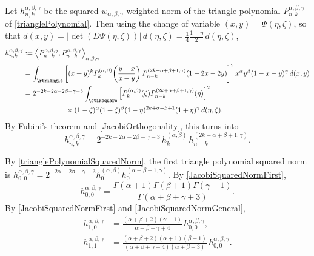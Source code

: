 \documentclass{article}
\numberwithin{equation}{section}
\numberwithin{figure}{section}
\begin{document}
Let $h^{\alpha,\beta,\gamma}_{n,k}$ be the squared $w_{\alpha,\beta,\gamma}$-weighted norm of the triangle polynomial $P^{\alpha,\beta,\gamma}_{n,k}$ of \eqref{trianglePolynomial}.
Then using the change of variable $(x,y) = \Psi(\eta,\zeta)$, so that $d(x,y) = \lvert \det(D\Psi(\eta,\zeta)) \rvert \, d(\eta,\zeta) = \frac{1}{4} \frac{1-\eta}{2} \, d(\eta,\zeta)$,
%
\begin{equation*}
\begin{split}
h^{\alpha,\beta,\gamma}_{n,k} & := \left\langle P^{\alpha,\beta,\gamma}_{n-k}, P^{\alpha,\beta,\gamma}_{n-k} \right\rangle_{\alpha,\beta,\gamma}\\
& = \int_\rtriangle \left[ (x+y)^k P^{(\alpha,\beta)}_k\mathopen{}\left( \frac{y-x}{x+y} \mathclose{}\right) P^{(2k+\alpha+\beta+1,\gamma)}_{n-k}(1-2x-2y) \right]^2 x^\alpha y^\beta (1-x-y)^\gamma \, d(x,y)\\
& = 2^{-2k-2\alpha-2\beta-\gamma-3} \int_\stixsquare \left[ P^{(\alpha,\beta)}_k(\zeta) P^{(2k+\alpha+\beta+1,\gamma)}_{n-k}(\eta) \right]^2\\& \qquad\qquad\qquad \times (1-\zeta)^\alpha (1+\zeta)^\beta (1-\eta)^{2k+\alpha+\beta+1} (1+\eta)^\gamma \, d(\eta,\zeta).
\end{split}
\end{equation*}
%
By Fubini's theorem and \eqref{JacobiOrthogonality}, this turns into
%
\begin{equation}\label{trianglePolynomialSquaredNorm}
h^{\alpha,\beta,\gamma}_{n,k} = 2^{-2k-2\alpha-2\beta-\gamma-3} \, h^{(\alpha,\beta)}_k \, h^{(2k+\alpha+\beta+1,\gamma)}_{n-k}.
\end{equation}
%

By \eqref{trianglePolynomialSquaredNorm}, the first triangle polynomial squared norm is $h^{\alpha,\beta,\gamma}_{0,0} = 2^{-2\alpha-2\beta-\gamma-3} h^{(\alpha,\beta)}_0 h^{(\alpha+\beta+1,\gamma)}_0$.
By \eqref{JacobiSquaredNormFirst},
%
\begin{equation}\label{h00}
h^{\alpha,\beta,\gamma}_{0,0}
= \frac{\Gamma(\alpha+1) \Gamma(\beta+1) \Gamma(\gamma+1)}{\Gamma(\alpha+\beta+\gamma+3)}.
\end{equation}
%
By \eqref{JacobiSquaredNormFirst} and \eqref{JacobiSquaredNormGeneral},
%
\begin{align}
\label{h10}%
h^{\alpha,\beta,\gamma}_{1,0} & = \frac{(\alpha+\beta+2)(\gamma+1)}{\alpha+\beta+\gamma+4} \, h^{\alpha,\beta,\gamma}_{0,0},\\
\label{h11}%
h^{\alpha,\beta,\gamma}_{1,1} & = \frac{(\alpha+\beta+2)(\alpha+1)(\beta+1)}{(\alpha+\beta+\gamma+4)(\alpha+\beta+3)} \, h^{\alpha,\beta,\gamma}_{0,0}.
\end{align}
%
\end{document}
